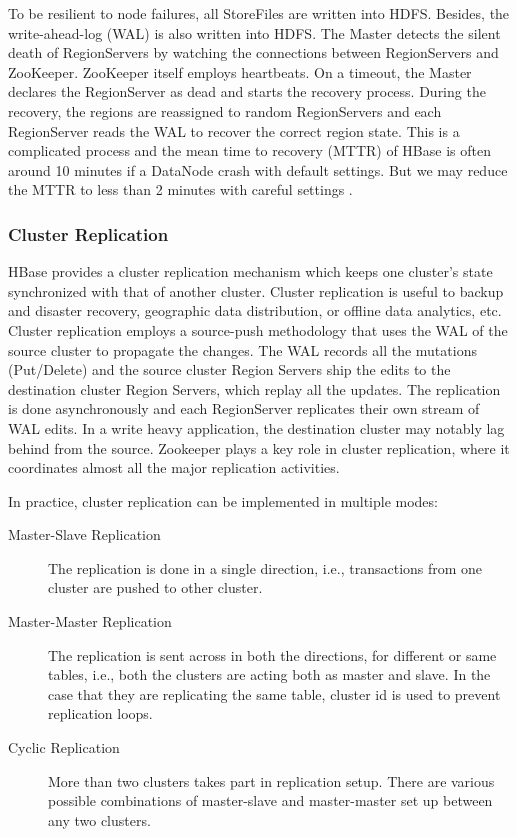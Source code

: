 \documentclass[11pt]{book}
\begin{document}
To be resilient to node failures, all StoreFiles are written into HDFS. Besides, the write-ahead-log (WAL) is also written into HDFS. The Master detects the silent death of RegionServers by watching the connections between RegionServers and ZooKeeper. ZooKeeper itself employs heartbeats. On a timeout, the Master declares the RegionServer as dead and starts the recovery process. During the recovery, the regions are reassigned to random RegionServers and each RegionServer reads the WAL to recover the correct region state. This is a complicated process and the mean time to recovery (MTTR) of HBase is often around 10 minutes if a DataNode crash with default settings. But we may reduce the MTTR to less than 2 minutes with careful settings \cite{HBaseMTTR}.

\subsubsection{Cluster Replication}

HBase provides a cluster replication mechanism which keeps one cluster's state synchronized with that of another cluster. Cluster replication is useful to backup and disaster recovery, geographic data distribution, or offline data analytics, etc. Cluster replication employs a source-push methodology that uses the WAL of the source cluster to propagate the changes. The WAL records all the mutations (Put/Delete) and the source cluster Region Servers ship the edits to the destination cluster Region Servers, which replay all the updates. The replication is done asynchronously and each RegionServer replicates their own stream of WAL edits. In a write heavy application, the destination cluster may notably lag behind from the source. Zookeeper plays a key role in cluster replication, where it coordinates almost all the major replication activities.

In practice, cluster replication can be implemented in multiple modes:
\begin{description}
\item[Master-Slave Replication]
The replication is done in a single direction, i.e., transactions from one cluster are pushed to other cluster.
\item[Master-Master Replication]
The replication is sent across in both the directions, for different or same tables, i.e., both the clusters are acting both as master and slave. In the case that they are replicating the same table, cluster id is used to prevent replication loops.
\item[Cyclic Replication]
More than two clusters takes part in replication setup. There are various possible combinations of master-slave and master-master set up between any two clusters. 
\end{description}
\end{document}
